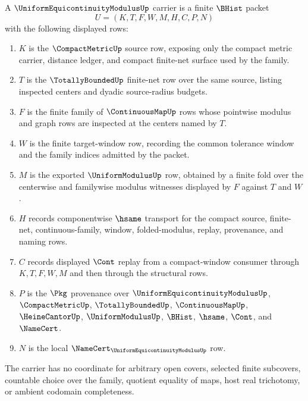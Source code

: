 \begin{definition}
\label{def:uniform-equicontinuity-modulus-carrier}
A $\UniformEquicontinuityModulusUp$ carrier is a finite $\BHist$ packet
$$
U=(K,T,F,W,M,H,C,P,N)
$$
with the following displayed rows:
\begin{enumerate}
\item $K$ is the $\CompactMetricUp$ source row, exposing only the compact metric carrier, distance ledger, and compact finite-net surface used by the family.
\item $T$ is the $\TotallyBoundedUp$ finite-net row over the same source, listing inspected centers and dyadic source-radius budgets.
\item $F$ is the finite family of $\ContinuousMapUp$ rows whose pointwise modulus and graph rows are inspected at the centers named by $T$.
\item $W$ is the finite target-window row, recording the common tolerance window and the family indices admitted by the packet.
\item $M$ is the exported $\UniformModulusUp$ row, obtained by a finite fold over the centerwise and familywise modulus witnesses displayed by $F$ against $T$ and $W$.
\item $H$ records componentwise $\hsame$ transport for the compact source, finite-net, continuous-family, window, folded-modulus, replay, provenance, and naming rows.
\item $C$ records displayed $\Cont$ replay from a compact-window consumer through $K,T,F,W,M$ and then through the structural rows.
\item $P$ is the $\Pkg$ provenance over $\UniformEquicontinuityModulusUp$, $\CompactMetricUp$, $\TotallyBoundedUp$, $\ContinuousMapUp$, $\HeineCantorUp$, $\UniformModulusUp$, $\BHist$, $\hsame$, $\Cont$, and $\NameCert$.
\item $N$ is the local $\NameCert_{\UniformEquicontinuityModulusUp}$ row.
\end{enumerate}
The carrier has no coordinate for arbitrary open covers, selected finite subcovers, countable choice over the family, quotient equality of maps, host real trichotomy, or ambient codomain completeness.
\end{definition}

